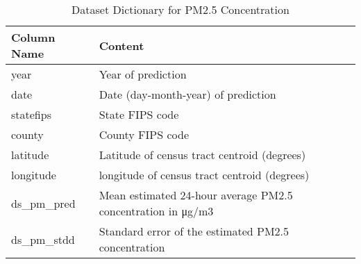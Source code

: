 \documentclass{article}
\begin{document}
\begin{table}[h]


\caption{\label{tab:questionIdTable2}Dataset Dictionary for PM2.5 Concentration}
\centering
\begin{tabular}{m|l}
Column Name & Content \\\hline
year & Year of prediction \\
date & Date (day-month-year) of prediction\\
statefips & State FIPS code \\
county & County FIPS code \\
latitude & Latitude of census tract centroid (degrees) \\
longitude & longitude of census tract centroid (degrees) \\
ds\_pm\_pred & Mean estimated 24-hour average PM2.5 concentration in μg/m3 \\
ds\_pm\_stdd & Standard error of the estimated PM2.5 concentration \\
\end{tabular}
\end{table}
\end{document}
